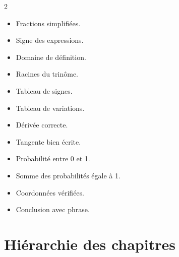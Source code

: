 \documentclass[11pt,a4paper]{article}
\begin{document}
\begin{methode}
\begin{multicols}{2}
\begin{itemize}
  \item Fractions simplifiées.
  \item Signe des expressions.
  \item Domaine de définition.
  \item Racines du trinôme.
  \item Tableau de signes.
  \item Tableau de variations.
  \item Dérivée correcte.
  \item Tangente bien écrite.
  \item Probabilité entre 0 et 1.
  \item Somme des probabilités égale à 1.
  \item Coordonnées vérifiées.
  \item Conclusion avec phrase.
\end{itemize}
\end{multicols}
\end{methode}

\section{Hiérarchie des chapitres}
\end{document}
